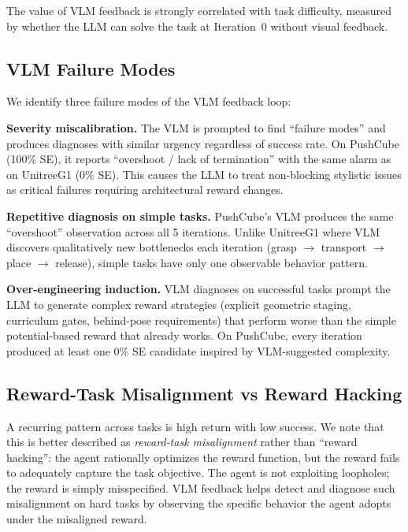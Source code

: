 \documentclass[conference]{IEEEtran}
\begin{document}

The value of VLM feedback is strongly correlated with task difficulty, measured
by whether the LLM can solve the task at Iteration~0 without visual feedback.

\subsection{VLM Failure Modes}

We identify three failure modes of the VLM feedback loop:

\textbf{Severity miscalibration.} The VLM is prompted to find ``failure modes''
and produces diagnoses with similar urgency regardless of success rate. On
PushCube (100\% SE), it reports ``overshoot / lack of termination'' with the
same alarm as on UnitreeG1 (0\% SE). This causes the LLM to treat non-blocking
stylistic issues as critical failures requiring architectural reward changes.

\textbf{Repetitive diagnosis on simple tasks.} PushCube's VLM produces the same
``overshoot'' observation across all 5 iterations. Unlike UnitreeG1 where VLM
discovers qualitatively new bottlenecks each iteration (grasp $\to$ transport
$\to$ place $\to$ release), simple tasks have only one observable behavior
pattern.

\textbf{Over-engineering induction.} VLM diagnoses on successful tasks prompt
the LLM to generate complex reward strategies (explicit geometric staging,
curriculum gates, behind-pose requirements) that perform worse than the simple
potential-based reward that already works. On PushCube, every iteration produced
at least one 0\% SE candidate inspired by VLM-suggested complexity.

\subsection{Reward-Task Misalignment vs Reward Hacking}

A recurring pattern across tasks is high return with low success. We note that
this is better described as \emph{reward-task misalignment} rather than
``reward hacking'': the agent rationally optimizes the reward function, but the
reward fails to adequately capture the task objective. The agent is not
exploiting loopholes; the reward is simply misspecified. VLM feedback helps
detect and diagnose such misalignment on hard tasks by observing the specific
behavior the agent adopts under the misaligned reward.
\end{document}
